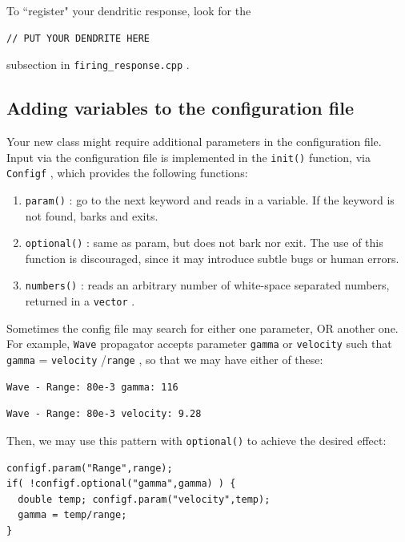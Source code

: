 \documentclass[12pt,a4paper]{article}
\newcommand{\type}[1]{{\small\small\tt #1} }
\begin{document}
To ``register" your dendritic response, look for the
\begin{lstlisting}
// PUT YOUR DENDRITE HERE
\end{lstlisting}
subsection in \type{firing\_response.cpp}.

\subsection{Adding variables to the configuration file}
\label{sec:init}

Your new class might require additional parameters in the configuration file. Input via the configuration file is implemented in the \type{init()} function, via \type{Configf}, which provides the following functions:
    \begin{enumerate}
        \item \type{param()}: go to the next keyword and reads in a variable. If the keyword is not found, barks and exits.
        \item \type{optional()}: same as param, but does not bark nor exit. The use of this function is discouraged, since it may introduce subtle bugs or human errors.
        \item \type{numbers()}: reads an arbitrary number of white-space separated numbers, returned in a \type{vector}.
    \end{enumerate}

    Sometimes the config file may search for either one parameter, OR another one. For example, \type{Wave} propagator accepts parameter \type{gamma} or \type{velocity} such that \type{gamma} = \type{velocity}/\type{range}, so that we may have either of these:
\begin{lstlisting}
Wave - Range: 80e-3 gamma: 116
\end{lstlisting}

\begin{lstlisting}
Wave - Range: 80e-3 velocity: 9.28
\end{lstlisting}

Then, we may use this pattern with \type{optional()} to achieve the desired effect:
\begin{lstlisting}
configf.param("Range",range);
if( !configf.optional("gamma",gamma) ) {
  double temp; configf.param("velocity",temp);
  gamma = temp/range;
}
\end{lstlisting}
\end{document}
